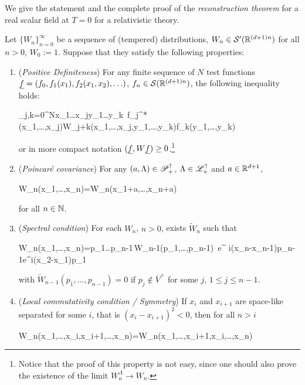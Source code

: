 \documentclass[../main/main.tex]{subfiles}
\begin{document}
We give the statement and the complete proof of the \emph{reconstruction theorem} for a real scalar field at $T=0$ for a relativistic theory.

\begin{theorem}
	Let $\{W_n\}_{n=0}^\infty$ be a sequence of (tempered) distributions, $W_n\in\mathcal S'(\mathbb{R}^{(d+1)n})$ for all $n>0$, $W_0:=1$. Suppose that they satisfy the following properties:
	\begin{enumerate}[label=(\arabic*)]
		\item (\emph{Positive Definiteness}) For any finite sequence of $N$ test functions $\uf=(f_0,f_1(x_1),f_2(x_1,x_2),\ldots)$, $f_n\in\mathcal S(\mathbb{R}^{(d+1)n})$, the following inequality holds:
		\begin{eq}
			\sum_{j,k=0}^N\int\de x_1\ldots\de x_j\de y_1\ldots\de y_k \,f_j^*(x_1,\ldots,x_j)W_{j+k}(x_1,\ldots,x_j,y_1,\ldots,y_k)f_k(y_1,\ldots,y_k)
		\end{eq}
		or in more compact notation $(\uf,W\uf)\geq0$.\footnote{Notice that the proof of this property is not easy, since one should also prove the existence of the limit $W_n^\Lambda\to W_n$.} 
		\item (\emph{Poincaré covariance}) For any $(a,\Lambda)\in\mathscr P_+^\uparrow$, $\Lambda\in\mathscr L_+^\uparrow$ and $a\in\mathbb{R}^{d+1}$, 
		\begin{eq}
			W_n(x_1,\ldots,x_n)=W_n(\Lambda x_1+a,\ldots,\Lambda x_n+a)
		\end{eq}
		for all $n\in\mathbb{N}$.
		\item (\emph{Spectral condition}) For each $W_n$, $n>0$, exists $\widetilde W_n$ such that
		\begin{eq}\label{eq:reconstr_thm_hp_3}
			W_n(x_1,\ldots,x_n)=\int\de p_1\ldots\de p_{n-1}\,\widetilde W_{n-1}(p_1,\ldots,p_{n-1})\, e^{ i(x_n-x_{n-1})p_{n-1}}\cdots e^{i(x_2-x_1)p_1}
		\end{eq}
		with $\widetilde W_{n-1}(p_1,\ldots,p_{n-1})=0$ if $p_j\not\in \overline V^+$ for some $j$, $1\leq j\leq n-1$. 
		\item (\emph{Local commutativity condition / Symmetry}) If $x_i$ and $x_{i+1}$ are space-like separated for some $i$, that is $(x_i-x_{i+1})^2<0$, then for all $n>i$
		\begin{eq}
			W_n(x_1,\ldots,x_i,x_{i+1},\ldots,x_n)=W_n(x_1,\ldots,x_{i+1},x_i,\ldots,x_n)
		\end{eq}

\end{enumerate}
\end{theorem}
\end{document}
